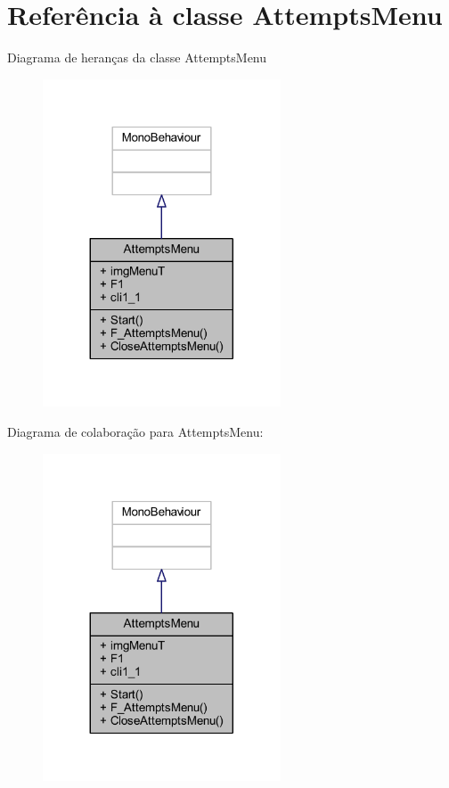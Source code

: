 \section{Referência à classe Attempts\+Menu}
\label{class_attempts_menu}


Diagrama de heranças da classe Attempts\+Menu
\nopagebreak
\begin{figure}[H]
\begin{center}
\leavevmode
\includegraphics[width=200pt]{class_attempts_menu__inherit__graph}
\end{center}
\end{figure}


Diagrama de colaboração para Attempts\+Menu\+:
\nopagebreak
\begin{figure}[H]
\begin{center}
\leavevmode
\includegraphics[width=200pt]{class_attempts_menu__coll__graph}
\end{center}
\end{figure}
